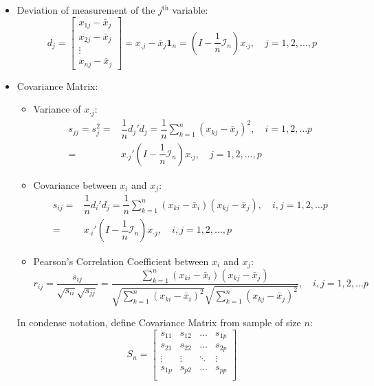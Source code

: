 \begin{itemize}[topsep=6pt,itemsep=4pt]
        \item Deviation of measurement of the $ j^\mathrm{th} $ variable:
        \begin{equation}
            d_j=\begin{bmatrix}
                x_{1j}-\bar{x}_j\\x_{2j}-\bar{x}_j\\\vdots\\x_{nj}-\bar{x}_j
            \end{bmatrix}=x_{.j}-\bar{x}_j\mathbf{1}_n = (I-\dfrac{1}{n}\mathcal{I}_n)x_{\cdot j},\quad j=1,2,\ldots,p
        \end{equation}
        \item Covariance Matrix:
            \begin{itemize}[topsep=6pt,itemsep=4pt]      
            \item Variance of $ x_{\cdot j} $:
            \begin{align}
                s_{jj}=s^2_j=&\dfrac{1}{n}d_j'd_j=\dfrac{1}{n}\sum_{k=1}^n (x_{kj}-\bar{x}_j)^2,\quad i=1,2,\ldots p\\
                =&x_{\cdot j}'(I-\dfrac{1}{n}\mathcal{I}_n)x_{\cdot j},\quad j=1,2,\ldots,p
            \end{align}
            \item Covariance between $ x_i $ and $ x_j $:
            \begin{align}
                s_{ij}=&\dfrac{1}{n}d_i'd_j=\dfrac{1}{n}\sum_{k=1}^n(x_{ki}-\bar{x}_i)(x_{kj}-\bar{x}_j),\quad i,j=1,2,\ldots p\\
                =&x_{\cdot i}'(I-\dfrac{1}{n}\mathcal{I}_n)x_{\cdot j},\quad i,j=1,2,\ldots,p
            \end{align}
            \item Pearson's Correlation Coefficient between $ x_i $ and $ x_j $:
            \begin{equation}\label{EqaEstimatorOfCorrelationCoefficient}
                r_{ij}=\dfrac{s_{ij}}{\sqrt{s_{ii}}\sqrt{s_{jj}}}=\dfrac{{\displaystyle\sum_{k=1}^n(x_{ki}-\bar{x}_i)(x_{kj}-\bar{x}_j)}}{\sqrt{{\displaystyle\sum_{k=1}^n(x_{ki}-\bar{x}_i)^2}}\sqrt{{\displaystyle\sum_{k=1}^n(x_{kj}-\bar{x}_j)^2}}},\quad i,j=1,2,\ldots p
            \end{equation}
            \end{itemize}
        
        In condense notation, define Covariance Matrix from sample of size $ n $:
        \begin{equation}\label{EqaSampleCovarianceMatrix}
            S_n=\begin{bmatrix}
            s_{11}&s_{12}&\ldots&s_{1p}\\
            s_{21}&s_{22}&\ldots&s_{2p}\\
            \vdots&\vdots&\ddots&\vdots\\
            s_{1p}&s_{p2}&\ldots&s_{pp}\\
            \end{bmatrix}
        \end{equation}


\end{itemize}
